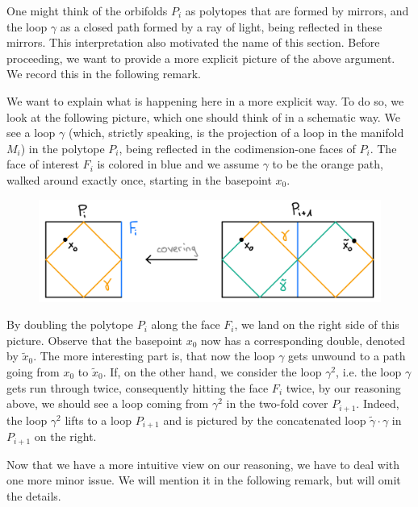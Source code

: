 One might think of the orbifolds \(P_i\) as polytopes that are formed by mirrors, and the loop \(\gamma\) as a closed path formed by a ray of light, being reflected in these mirrors.
This interpretation also motivated the name of this section.
Before proceeding, we want to provide a more explicit picture of the above argument.
We record this in the following remark.

\begin{remark}
    We want to explain what is happening here in a more explicit way.
    To do so, we look at the following picture, which one should think of in a schematic way.
    We see a loop \(\gamma\) (which, strictly speaking, is the projection of a loop in the manifold \(M_i\)) in the polytope \(P_i\), being reflected in the codimension-one faces of \(P_i\).
    The face of interest \(F_i\) is colored in blue and we assume \(\gamma\) to be the orange path, walked around exactly once, starting in the basepoint \(x_0\).
    \begin{figure}[h!]
        \label{fig:ray}
        \centering
        \includegraphics[width=.8\textwidth]{gfx/Ray bouncing in P.png}
    \end{figure}\vspace*{-\parskip}\newpage

    \noindent
    By doubling the polytope \(P_i\) along the face \(F_i\), we land on the right side of this picture.
    Observe that the basepoint \(x_0\) now has a corresponding double, denoted by \(\widetilde{x}_0\).
    The more interesting part is, that now the loop \(\gamma\) gets unwound to a path going from \(x_0\) to \(\widetilde{x}_0\).
    If, on the other hand, we consider the loop \(\gamma^2\), i.e. the loop \(\gamma\) gets run through twice, consequently hitting the face \(F_i\) twice, by our reasoning above, we should see a loop coming from \(\gamma^2\) in the two-fold cover \(P_{i+1}\).
    Indeed, the loop \(\gamma^2\) lifts to a loop \(P_{i+1}\) and is pictured by the concatenated loop \(\widetilde{\gamma} \cdot \gamma\) in \(P_{i+1}\) on the right.
\end{remark}

Now that we have a more intuitive view on our reasoning, we have to deal with one more minor issue.
We will mention it in the following remark, but will omit the details.

